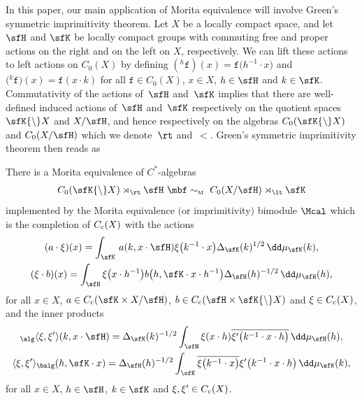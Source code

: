 In this paper, our main application of Morita equivalence will involve
Green's symmetric imprimitivity theorem. Let $X$ be a locally compact space, and let
$\sfH $ and $\sfK $ be locally compact groups with commuting free and
proper actions on the right and on the left on $X$, respectively. We can lift these
actions to left actions on $C_0(X)$ by defining
$({}^h\mathtt{f})(x)=\mathtt{f}\big(h^{-1}\cdot x\big)$ and $\big({}^k\mathtt{f}\big)(x)=\mathtt{f}(x\cdot k)$
for all $\mathtt{f}\in C_0(X)$, $x\in X$, $h\in \sfH$ and $k\in \sfK $. Commutativity
of the actions of~$\sfH $ and~$\sfK $ implies that there are well-defined
induced actions of~$\sfH $ and~$\sfK $
respectively on the quotient spaces $\sfK {\setminus} X$ and $X/\sfH $, and hence
respectively on the algebras $C_0(\sfK {\setminus} X)$ and
$C_0(X/\sfH )$ which we denote~$\rt$ and~$\lt$. Green's symmetric imprimitivity theorem then reads as~\cite[Corollary~4.10]{Williams2007}
\begin{Theorem} \label{thm:Green}
There is a Morita
equivalence of $C^*$-algebras
\begin{gather}\label{eq:Greenimprim}
C_0(\sfK {\setminus} X)\rtimes_\rt \sfH \ \mbf\sim_{\text{\rm \tiny M}} \ C_0(X/\sfH )\rtimes_\lt \sfK
\end{gather}
implemented by the Morita equivalence $($or imprimitivity$)$
bimodule $\Mcal$ which is the completion of $C_{\rm c}(X)$ with the
actions
\begin{gather*}
(a\cdot\xi)(x) =\int_\sfK\,a(k,x\cdot\sfH) \xi\big(k^{-1}\cdot x\big)
\Delta_\sfK(k)^{1/2} \, \dd\mu_\sfK(k) , \\
(\xi\cdot b)(x) =\int_\sfH \xi\big(x\cdot h^{-1}\big) b\big(h,\sfK\cdot x\cdot h^{-1}\big) \Delta_\sfH(h)^{-1/2} \, \dd\mu_\sfH(h) ,
\end{gather*}
for all $x\in X$, $a\in C_{\rm c}(\sfK\times X/\sfH)$, $b\in C_{\rm
 c}(\sfH\times \sfK {\setminus} X)$ and $\xi\in C_{\rm
 c}(X)$, and the inner products
\begin{gather*}
{}_\alg\langle\xi,\xi'\rangle(k,x\cdot\sfH) = \Delta_\sfK(k)^{-1/2}
\int_\sfH \xi(x\cdot h) \overline{\xi'\big(k^{-1}\cdot x\cdot h\big)} \,
\dd\mu_\sfH(h) , \nonumber\\
\langle\xi,\xi'\rangle_\balg(h,\sfK\cdot x) =
\Delta_\sfH(h)^{-1/2} \int_\sfK \overline{\xi\big(k^{-1}\cdot x\big)}
\xi'\big(k^{-1}\cdot x\cdot h\big) \, \dd\mu_\sfK(k)  ,
\end{gather*}
for all $x\in X$, $h\in\sfH$, $k\in\sfK$ and $\xi,\xi'\in C_{\rm c}(X)$.
\end{Theorem}

